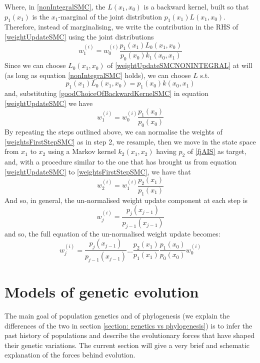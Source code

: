 \documentclass[12pt,mythesisstyle]{report}
\begin{document}
Where, in \eqref{nonIntegralSMC}, the $L(x_1,x_0)$ is a backward kernel, built so that $p_1(x_1)$ is the $x_1$-marginal of the joint distribution $p_1(x_1)L(x_1,x_0)$. Therefore, instead of marginalising, we write the contribution in the RHS of \eqref{weightUpdateSMC} using the joint distributions
\begin{equation}\label{weightUpdateSMCNONINTEGRAL}
w^{(i)}_1=w^{(i)}_0\frac{p_1(x_1)L_0(x_1,x_0)}{p_0(x_0)k_1(x_0,x_1)}
\end{equation}
Since we can choose $L_0(x_1,x_0)$ of \eqref{weightUpdateSMCNONINTEGRAL} at will (as long as equation \eqref{nonIntegralSMC} holds), we can choose $L$ s.t.
\begin{equation}\label{goodChoiceOfBackwardKernelSMC}
p_1(x_1)L_0(x_1,x_0)=p_1(x_0)k(x_0,x_1)
\end{equation}
and, substituting \eqref{goodChoiceOfBackwardKernelSMC} in equation \eqref{weightUpdateSMC} we have
\begin{equation}\label{weightsFirstStepSMC}
w^{(i)}_1=w^{(i)}_0\frac{p_1(x_0)}{p_0(x_0)}
\end{equation}
By repeating the steps outlined above, we can normalise the weights of \eqref{weightsFirstStepSMC} as in step 2, we resample, then we move in the state space from $x_1$ to $x_2$ using a Markov kernel $k_2(x_1,x_2)$ having $p_2$ of \eqref{fjAIS} as target, and, with a procedure similar to the one that has brought us from equation \eqref{weightUpdateSMC} to \eqref{weightsFirstStepSMC}, we have that
\begin{equation}\label{weightsSecondStepSMC}
w^{(i)}_2=w^{(i)}_1\frac{p_2(x_1)}{p_1(x_1)}
\end{equation}
And so, in general, the un-normalised weight update component at each step is
\begin{equation}\label{smcPartialWeightUpdate}
	w^{(i)}_j=\frac{p_j(x_{j-1})}{p_{j-1}(x_{j-1})}
\end{equation}
and so, the full equation of the un-normalised weight update becomes:
\begin{equation}\label{smcPartialWeightUpdate}
	w^{(i)}_j=\frac{p_j(x_{j-1})}{p_{j-1}(x_{j-1})}...\frac{p_2(x_{1})}{p_{1}(x_{1})}\frac{p_1(x_{0})}{p_{0}(x_{0})}w^{(i)}_0
\end{equation}


\section{Models of genetic evolution}\label{section: models of genetic evolution}
The main goal of population genetics and of phylogenesis (we explain the differences of the two in section \ref{section: genetics vs phylogenesis}) is to infer the past history of populations and describe the evolutionary forces that have shaped their genetic variations. The current section will give a very brief and schematic explanation of the forces behind evolution.
\end{document}
